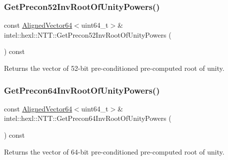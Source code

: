 \subsubsection{\texorpdfstring{Get\+Precon52\+Inv\+Root\+Of\+Unity\+Powers()}{GetPrecon52InvRootOfUnityPowers()}}
{\footnotesize\ttfamily const \hyperlink{namespaceintel_1_1hexl_afbdf0d2cc4209ee547a88ff22a02801b}{Aligned\+Vector64}$<$uint64\+\_\+t$>$\& intel\+::hexl\+::\+N\+T\+T\+::\+Get\+Precon52\+Inv\+Root\+Of\+Unity\+Powers (\begin{DoxyParamCaption}{ }\end{DoxyParamCaption}) const\hspace{0.3cm}{\ttfamily [inline]}}



Returns the vector of 52-\/bit pre-\/conditioned pre-\/computed root of unity. 

\mbox{\label{classintel_1_1hexl_1_1NTT_a0f7f195efe5166b0f3a8c9e71f3a405a}} 
\subsubsection{\texorpdfstring{Get\+Precon64\+Inv\+Root\+Of\+Unity\+Powers()}{GetPrecon64InvRootOfUnityPowers()}}
{\footnotesize\ttfamily const \hyperlink{namespaceintel_1_1hexl_afbdf0d2cc4209ee547a88ff22a02801b}{Aligned\+Vector64}$<$uint64\+\_\+t$>$\& intel\+::hexl\+::\+N\+T\+T\+::\+Get\+Precon64\+Inv\+Root\+Of\+Unity\+Powers (\begin{DoxyParamCaption}{ }\end{DoxyParamCaption}) const\hspace{0.3cm}{\ttfamily [inline]}}



Returns the vector of 64-\/bit pre-\/conditioned pre-\/computed root of unity. 

\mbox{\label{classintel_1_1hexl_1_1NTT_a3bddde00a1832f4ac175e71469939e51}} 
